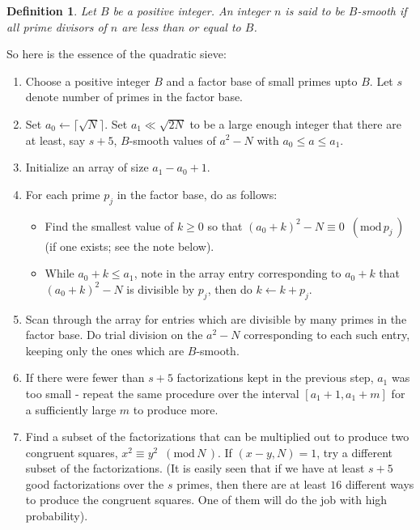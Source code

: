 \documentclass[12pt]{article}
\newtheorem{definition}[thm]{Definition}
\newenvironment{defn}{\begin{definition}\rm}{\end{definition}}
\newcommand{\md}[1]{\,\,\, ( \mathrm{mod}\, #1 \,) }
\begin{document}
  \begin{defn} \label{defn:smooth}
    Let $B$ be a positive integer. An integer $n$ is said to be
    {\em $B$-smooth} if all prime divisors of $n$ are less than
    or equal to $B$.
  \end{defn}

  So here is the essence of the quadratic sieve:
  \begin{enumerate}
    \item
      Choose a positive integer $B$ and
      a factor base of small primes upto $B$. Let $s$ denote
      number of primes in the factor base.
    \item
      Set $a_0\gets \lceil \sqrt{N}\rceil$. Set $a_1 \ll \sqrt{2N}$ to
      be a large enough integer that there are at least, say $s+5$,
      $B$-smooth values of $a^2-N$ with $a_0\le a\le a_1$.
    \item
      Initialize an array of size $a_1-a_0+1$.
    \item \label{qs:step4}
      For each prime $p_j$ in the factor base, do as follows:
      \begin{itemize}
        \item
          Find the smallest value of $k\ge 0$ so that 
          $(a_0 + k)^2 - N \equiv 0 \md{p_j}$ (if one exists; see
          the note below).
        \item
          While $a_0+k \le a_1$, note in the array entry corresponding to $a_0+k$
          that $(a_0+k)^2-N$ is divisible by $p_j$, then do $k\gets k+p_j$.
      \end{itemize}
    \item
      Scan through the array for entries which are divisible by many
      primes in the factor base. Do trial division on the $a^2 - N$
      corresponding to each such entry, keeping only the ones which
      are $B$-smooth.
    \item
      If there were fewer than $s+5$ factorizations kept in the previous
      step, $a_1$ was too small - repeat the same procedure over the 
      interval $[a_1+1, a_1+m]$ for a sufficiently large $m$ to produce
      more.
    \item
      Find a subset of the factorizations that can be multiplied out
      to produce two congruent squares, $x^2\equiv y^2\md{N}$.
      If $(x-y, N)=1$, try a different subset of the factorizations.
      (It is easily seen that if we have at least $s+5$ good factorizations
      over the $s$ primes, then there are at least $16$ different ways
      to produce the congruent squares. One of them will do the job
      with high probability).
  \end{enumerate}
\end{document}
